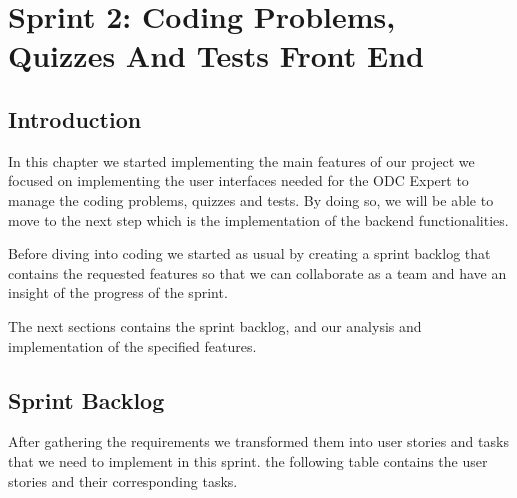 \chapter{Sprint 2: Coding Problems, Quizzes And Tests Front End}

\section{Introduction}
In this chapter we started implementing the main features of our project we focused
on implementing the user interfaces needed for the ODC Expert to manage the coding problems, quizzes and tests.
By doing so, we will be able to move to the next step which is the implementation of the backend functionalities.

Before diving into coding we started as usual by creating a sprint backlog that contains the requested features
so that we can collaborate as a team and have an insight of the progress of the sprint.

The next sections contains the sprint backlog, and our analysis and implementation of the specified features.

\section{Sprint Backlog}
After gathering the requirements we transformed them into user stories and tasks that we need to implement in this sprint.
the following table contains the user stories and their corresponding tasks.

